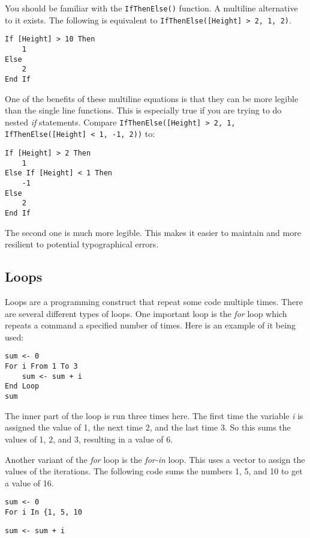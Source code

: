 \documentclass[]{memoir}
\begin{document}
You should be familiar with the \lstinline!IfThenElse()! function. A
multiline alternative to it exists. The following is equivalent to
\lstinline!IfThenElse([Height] > 2, 1, 2)!.

\begin{lstlisting}
If [Height] > 10 Then
    1
Else
    2
End If
\end{lstlisting}

One of the benefits of these multiline equations is that they can be
more legible than the single line functions. This is especially true if
you are trying to do nested \emph{if} statements. Compare
\lstinline!IfThenElse([Height] > 2, 1, IfThenElse([Height] < 1, -1, 2))!
to:

\begin{lstlisting}
If [Height] > 2 Then
    1
Else If [Height] < 1 Then
    -1
Else
    2
End If
\end{lstlisting}

The second one is much more legible. This makes it easier to maintain
and more resilient to potential typographical errors.

\subsection{Loops}

Loops are a programming construct that repeat some code multiple times.
There are several different types of loops. One important loop is the
\emph{for} loop which repeats a command a specified number of times.
Here is an example of it being used:

\begin{lstlisting}
sum <- 0
For i From 1 To 3
    sum <- sum + i
End Loop
sum
\end{lstlisting}

The inner part of the loop is run three times here. The first time the
variable \emph{i} is assigned the value of 1, the next time 2, and the
last time 3. So this sums the values of 1, 2, and 3, resulting in a
value of 6.

Another variant of the \emph{for} loop is the \emph{for-in} loop. This
uses a vector to assign the values of the iterations. The following code
sums the numbers 1, 5, and 10 to get a value of 16.

\begin{lstlisting}
sum <- 0
For i In {1, 5, 10
\end{lstlisting}

\begin{lstlisting}
sum <- sum + i
\end{lstlisting}
\end{document}
